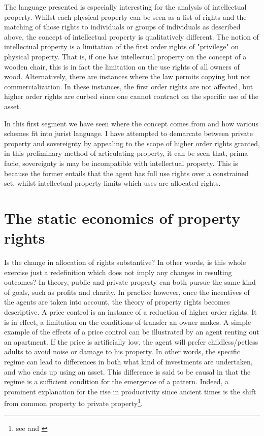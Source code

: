 The language presented is especially interesting for the analysis of intellectual property. Whilst each physical property can be seen as a list of rights and the matching of those rights to individuals or groups of individuals as described above, the concept of intellectual property is qualitatively different. The notion of intellectual property is a limitation of the first order rights of "privilege" on physical property. That is, if one has intellectual property on the concept of a wooden chair, this is in fact the limitation on the use rights of all owners of wood. Alternatively, there are instances where the law permits copying but not commercialization. In these instances, the first order rights are not affected, but higher order rights are curbed since one cannot contract on the specific use of the asset.

In this first segment we have seen where the concept comes from and how various schemes fit into jurist language. I have attempted to demarcate between private property and sovereignty by appealing to the scope of higher order rights granted, in this preliminary method of articulating property, it can be seen that, prima facie, sovereignty is may be incompatible with intellectual property. This is because the former entails that the agent has full use rights over a constrained set, whilst intellectual property limits which uses are allocated rights. 

\section{The static economics of property rights}\label{static}

Is the change in allocation of rights substantive? In other words, is this whole exercise just a redefinition which does not imply any changes in resulting outcomes? In theory, public and private property can both pursue the same kind of goals, such as profits and charity. In practice however, once the incentives of the agents are taken into account, the theory of property rights becomes descriptive. A price control is an instance of a reduction of higher order rights. It is in effect, a limitation on the conditions of transfer an owner makes. A simple example of the effects of a price control can be illustrated by an agent renting out an apartment. If the price is artificially low, the agent will prefer childless/petless adults to avoid noise or damage to his property. In other words, the specific regime can lead to differences in both what kind of investments are undertaken, and who ends up using an asset. This difference is said to be causal in that the regime is a sufficient condition for the emergence of a pattern. Indeed, a prominent explanation for the rise in productivity since ancient times is the shift from common property to private property\footnote{see \cite{anderson1983privatizing} and \cite{north1973rise}}.

